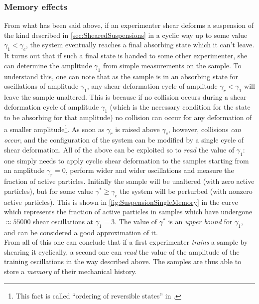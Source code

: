 \subsubsection{Memory effects}
From what has been said above, if an experimenter shear deforms a suspension of the kind described in \autoref{sec:ShearedSuspensions} in a cyclic way up to some value $\gamma_{1} < \gamma_{c}$, the system eventually reaches a final absorbing state which it can't leave. 
It turns out that if such a final state is handed to some other experimenter, she can determine the amplitude $\gamma_{1}$ from simple measurements on the sample.
To understand this, one can note that as the sample is in an absorbing state for oscillations of amplitude $\gamma_{1}$, any shear deformation cycle of amplitude $\gamma_{r} < \gamma_{1}$ will leave the sample unaltered. This is because if no collision occurs during a shear deformation cycle of amplitude $\gamma_{1}$ (which is the necessary condition for the state to be absorbing for that amplitude) no collision can occur for any deformation of a smaller amplitude\footnote{This fact is called ``ordering of reversible states'' in \cite{keim2011generic}.}. As soon as $\gamma_{r}$ is raised above $\gamma_{c}$, however, collisions \emph{can occur}, and the configuration of the system can be modified by a single cycle of shear deformation.
All of the above can be exploited so to \emph{read} the value of $\gamma_{1}$: one simply needs to apply cyclic shear deformation to the samples starting from an amplitude $\gamma_{r} = 0$, perform wider and wider oscillations and measure the fraction of active particles. Initially the sample will be unaltered (with zero active particles), but for some value $\gamma^{*} \geq \gamma_{c}$ the system will be perturbed (with nonzero active particles). This is shown in \autoref{fig:SuspensionSingleMemory} in the curve which represents the fraction of active particles in samples which have undergone $\approx 55000$ shear oscillations at $\gamma_{1} = 3$. The value of $\gamma^{*}$ is an \emph{upper bound} for $\gamma_{1}$, and can be considered a good approximation of it.\\
From all of this one can conclude that if a first experimenter \emph{trains} a sample by shearing it cyclically, a second one can \emph{read} the value of the amplitude of the training oscillations in the way described above. The samples are thus able to store a \emph{memory} of their mechanical history.


